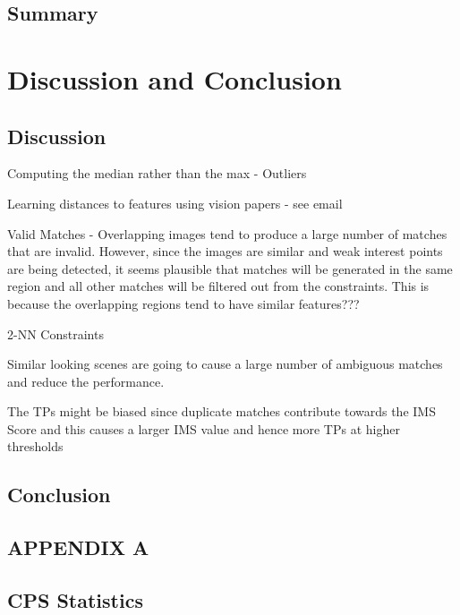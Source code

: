 \documentclass[11pt]{report}
\begin{document}
\section{Summary}
\label{sec:summary}

\chapter{Discussion and Conclusion}
\label{sec:discussionConclusion}

\section{Discussion}
\label{sec:discussion}
Computing the median rather than the max - Outliers

Learning distances to features using vision papers - see email

Valid Matches - Overlapping images tend to produce a large number of matches that are invalid. However, since the images are similar and weak interest points are being detected, it seems plausible that matches will be generated in the same region and all other matches will be filtered out from the constraints. This is because the overlapping regions tend to have similar features???

2-NN Constraints

Similar looking scenes are going to cause a large number of ambiguous matches and reduce the performance.

The TPs might be biased since duplicate matches contribute towards the IMS Score and this causes a larger IMS value and hence more TPs at higher thresholds

\section{Conclusion}
\label{sec:conclusion}



 \newpage
\onecolumn
\appendix
\setcounter{table}{0}
\setcounter{figure}{0}
\setcounter{subsection}{0}
\makeatletter \renewcommand{\thefigure}{A.\@arabic\c@figure} \renewcommand{\thetable}{A.\@arabic\c@table} \renewcommand{\thesection}{A.\@arabic\c@section} \makeatother
\section*{APPENDIX A}

\section{CPS Statistics}
\label{app:cps}
\end{document}
